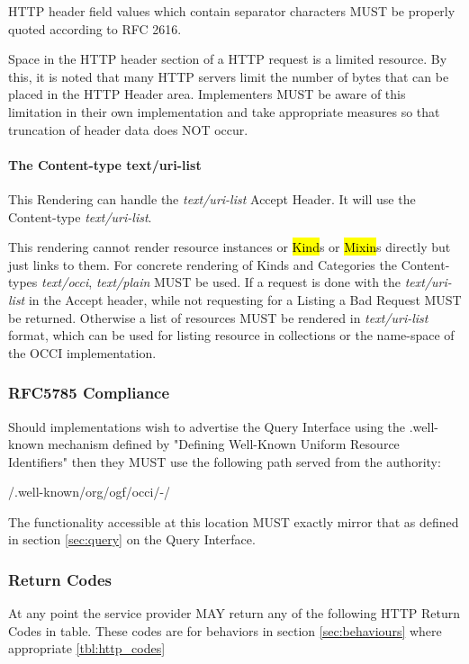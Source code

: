 \documentclass[10pt,a4paper]{article}
\begin{document}
HTTP header field values which contain separator characters MUST be
properly quoted according to RFC 2616.

Space in the HTTP header section of a HTTP request is a limited
resource. By this, it is noted that many HTTP servers limit the number
of bytes that can be placed in the HTTP Header area. Implementers MUST
be aware of this limitation in their own implementation and take
appropriate measures so that truncation of header data does NOT occur.

\paragraph{The Content-type text/uri-list}
This Rendering can handle the \textit{text/uri-list} Accept Header. It
will use the Content-type \textit{text/uri-list}.

This rendering cannot render resource instances or \hl{Kind}s or
\hl{Mixin}s directly but just links to them. For concrete rendering of
Kinds and Categories the Content-types \textit{text/occi},
\textit{text/plain} MUST be used. If a request is done with the
\textit{text/uri-list} in the Accept header, while not requesting for
a Listing a Bad Request MUST be returned. Otherwise a list of
resources MUST be rendered in \emph{text/uri-list} format, which can
be used for listing resource in collections or the name-space of the
OCCI implementation.

\subsubsection{RFC5785 Compliance}
\label{sec:rfc5785_compliance}
Should implementations wish to advertise the Query Interface using the
.well-known mechanism defined by "Defining Well-Known Uniform Resource
Identifiers" \cite{rfc5785} then they MUST use the following path
served from the authority:

/.well-known/org/ogf/occi/-/

The functionality accessible at this location MUST exactly mirror that
as defined in section \ref{sec:query} on the Query Interface.

\subsubsection{Return Codes}
\label{sec:return_codes}
At any point the service provider MAY return any of the following HTTP
Return Codes in table. These codes are for behaviors in section
\ref{sec:behaviours} where appropriate \ref{tbl:http_codes}
\end{document}
